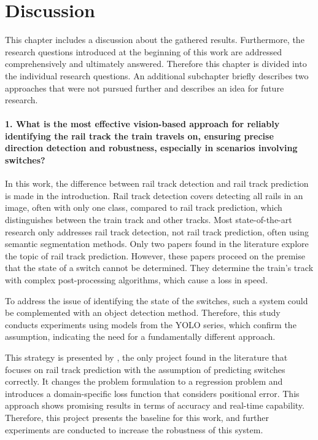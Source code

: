 \chapter{Discussion}
\label{sec:discussion}

This chapter includes a discussion about the gathered results.
Furthermore, the research questions introduced at the beginning of this work are addressed comprehensively and ultimately answered.
Therefore this chapter is divided into the individual research questions.
An additional subchapter briefly describes two approaches that were not pursued further and describes an idea for future research.

\subsubsection{1. What is the most effective vision-based approach for reliably identifying the rail track the train travels on, ensuring precise direction detection and robustness, especially in scenarios involving switches?}

In this work, the difference between rail track detection and rail track prediction is made in the introduction.
Rail track detection covers detecting all rails in an image, often with only one class, compared to rail track prediction, which distinguishes between the train track and other tracks.
Most state-of-the-art research only addresses rail track detection, not rail track prediction, often using semantic segmentation methods.
Only two papers found in the literature explore the topic of rail track prediction.
However, these papers proceed on the premise that the state of a switch cannot be determined.
They determine the train's track with complex post-processing algorithms, which cause a loss in speed.

To address the issue of identifying the state of the switches, such a system could be complemented with an object detection method.
Therefore, this study conducts experiments using models from the \ac{YOLO} series, which confirm the assumption, indicating the need for a fundamentally different approach.

This strategy is presented by \cite{tepNet2024}, the only project found in the literature that focuses on rail track prediction with the assumption of predicting switches correctly.
It changes the problem formulation to a regression problem and introduces a domain-specific loss function that considers positional error.
This approach shows promising results in terms of accuracy and real-time capability.
Therefore, this project presents the baseline for this work, and further experiments are conducted to increase the robustness of this system.

